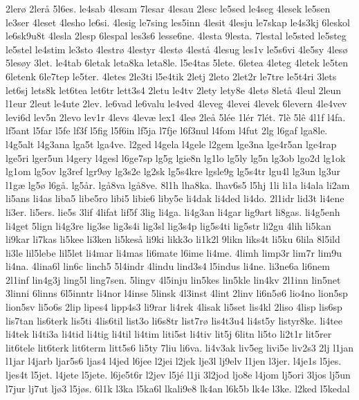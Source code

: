 2ler^^f8
2ler^^e5
5l6es.
le4sab
4lesam
7lesar
4lesau
2lesc
le5sed
le4seg
4lesek
le5sen
le3ser
4leset
4lesho
le6si.
4lesig
le7sing
les5inn
4lesit
4lesju
le7skap
le4s3kj
6leskol
le6sk9u8t
4lesla
2lesp
6lespal
les3s6
lesse6ne.
4lesta
9lesta.
7lestal
le5sted
le5steg
le5stel
le4stim
le3sto
4lestr^^f8
4lestyr
4lest^^f8
4lest^^e5
4lesug
les1v
le5s6vi
4le5sy
4les^^f8
5les^^f8y
3let.
le4tab
6letak
leta8ka
leta8le.
l5e4tas
5lete.
6letea
4leteg
4letek
le5ten
6letenk
6le7tep
le5ter.
4letes
2le3ti
l5e4tik
2letj
2leto
2let2r
le7tre
le5t4ri
3lets
let6sj
lets8k
let6tea
let6tr
lett3s4
2letu
le4tv
2lety
lety8e
4let^^f8
8let^^e5
4leul
2leun
l1eur
2leut
le4ute
2lev.
le6vad
le6valu
le4ved
4leveg
4levei
4levek
6levern
4le4vev
levi6d
lev5n
2levo
lev1r
4levs
4lev^^e6
lex1
4le^^f8
2le^^e5
5l^^e9e
1l^^e9r
7l^^e9t.
7l^^e8
5l^^ea
4l1f
l4fa.
lf5ant
l5far
l5fe
lf3f
l5fig
l5f6in
lf5ja
l7fje
l6f3nul
l4fom
l4fut
2lg
l6gaf
lga8le.
l4g5alt
l4g3ana
lga5t
lga4ve.
l2ged
l4gela
l4gele
l2gem
lge3na
lge4r5an
lge4rap
lge5ri
lger5un
l4gery
l4gesl
l6ge7sp
lg5g
lgie8n
lg1lo
lg5ly
lg5n
lg3ob
lgo2d
lg1ok
lg1om
lg5ov
lg3ref
lgr9^^f8y
lg3s2e
lg2sk
lg5s4kre
lgsle9g
lg5s4tr
lgu4l
lg3un
lg3ur
l1g^^e6
lg5^^f8
l6g^^e5.
lg5^^e5r.
lg^^e58va
lg^^e58ve.
8l1h
lha8ka.
lhav6s5
l5hj
1li
li1a
li4ala
li2am
li5ans
li4as
liba5
libe5ro
libi5
libie6
liby5e
li4dak
li4ded
li4do.
2l1idr
lid3t
li4ene
li3er.
li5ers.
lie5s
3lif
4lifat
lif5f
3lig
li4ga.
li4g3an
li4gar
lig9art
li8gas.
li4g5enh
li4get
5lign
li4g3re
lig3se
lig3s4i
lig3sl
lig3s4p
lig5s4ti
lig5str
li2gu
4lih
li5kan
li9kar
li7kas
li5kee
li3ken
li5kes^^e5
li9ki
likk3o
li1k2l
9likn
liks4t
li5ku
6lila
8l5ild
li3le
lil5lebe
lil5let
li4mar
li4mas
li6mate
l6ime
li4me.
4limh
limp3r
lim7r
lim9u
li4na.
4lina6l
lin6c
linch5
5l4indr
4lindu
lind3s4
l5indus
li4ne.
li3ne6a
li6nem
2l1inf
lin4g3j
ling5l
ling7sen.
5lingv
4l5inju
lin5kes
lin5kle
lin4kv
2l1inn
lin5net
3linni
6linns
6l5inntr
li4nor
l4inse
5linsk
4l3inst
4lint
2linv
li6n5^^f86
lio4no
lion5sp
lion5sv
li5o6s
2lip
lipes4
lipp4s3
li9rar
li4rek
4lisak
li5set
lis4kl
2liso
4lisp
lis6sp
lis7tan
lis6terk
lis5ti
4lis6til
list3o
li6s8tr
list7r^^f8
lis4t3u4
li4st5y
listyr8ke.
li4tee
li4tek
li4ti3a
li4tid
li4tig
li4til
li4tim
liti5st
li4tiv
lit5j
6litn
li5to
li2t1r
lit5rer
lit6tele
lit6terk
lit6term
litt5s6
li5ty
7liu
li6va.
li4v3ak
liv5eg
livi5e
liv2s3
2lj
l1jan
l1jar
l4jarb
ljar5s6
ljas4
l4jed
l6jee
l2jei
l2jek
lje3l
lj9elv
l1jen
l3jer.
l4je1s
l5jes.
ljes4t
l5jet.
l4jete
l5jete.
l6je5t6r
l2jev
l5j^^e9
l1ji
3l2jod
ljo8e
l4jom
lj5ori
3ljos
lj5un
l7jur
lj7ut
lj^^f83
l5j^^f8s.
6l1k
l3ka
l5ka6l
lkali9e8
lk4an
l6k5b
lk4e
l3ke.
l2ked
l5kedal
